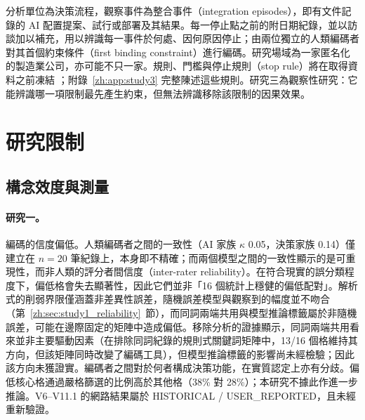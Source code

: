 分析單位為決策流程，觀察事件為整合事件（integration episodes），即有文件記錄的 AI 配置提案、試行或部署及其結果。每一停止點之前的附日期紀錄，並以訪談加以補充，用以辨識每一事件於何處、因何原因停止；由兩位獨立的人類編碼者對其首個約束條件（first binding constraint）進行編碼。研究場域為一家匿名化的製造業公司，亦可能不只一家。規則、門檻與停止規則（stop rule）將在取得資料之前凍結 \citep{nosek2018preregistration}；附錄~\ref{zh:app:study3} 完整陳述這些規則。研究三為觀察性研究：它能辨識哪一項限制最先產生約束，但無法辨識移除該限制的因果效果。

\section{研究限制}
\label{zh:sec:limitations}

\subsection{構念效度與測量}
\label{zh:sec:lim_measurement}

\paragraph{研究一。}編碼的信度偏低。人類編碼者之間的一致性（AI 家族 $\kappa$ 0.05，決策家族 0.14）僅建立在 $n=20$ 筆紀錄上，本身即不精確；而兩個模型之間的一致性顯示的是可重現性，而非人類的評分者間信度（inter-rater reliability）。在符合現實的誤分類程度下，偏低格會失去顯著性，因此它們並非「16 個統計上穩健的偏低配對」。解析式的削弱界限僅涵蓋非差異性誤差，隨機誤差模型與觀察到的幅度並不吻合（第~\ref{zh:sec:study1_reliability}~節），而同詞兩端共用與模型推論標籤屬於非隨機誤差，可能在邊際固定的矩陣中造成偏低。移除分析的證據顯示，同詞兩端共用看來並非主要驅動因素（在排除同詞紀錄的規則式關鍵詞矩陣中，13/16 個格維持其方向，但該矩陣同時改變了編碼工具），但模型推論標籤的影響尚未經檢驗；因此該方向未獲證實。編碼者之間對於何者構成決策功能，在實質認定上亦有分歧。偏低核心格通過嚴格篩選的比例高於其他格（38\% 對 28\%）；本研究不據此作進一步推論。V6--V11.1 的網路結果屬於 HISTORICAL / USER\_REPORTED，且未經重新驗證。

